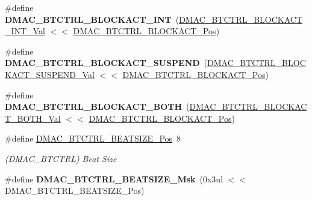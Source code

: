 \begin{DoxyCompactItemize}
\item 
\hypertarget{group___s_a_m_l21___d_m_a_c_gaaba7920eeccf5ffffb8eb5c977fcde63}{}\#define {\bfseries D\+M\+A\+C\+\_\+\+B\+T\+C\+T\+R\+L\+\_\+\+B\+L\+O\+C\+K\+A\+C\+T\+\_\+\+I\+N\+T}~(\hyperlink{group___s_a_m_l21___d_m_a_c_ga8605dcd06a16a3950e7181cd5a231bfc}{D\+M\+A\+C\+\_\+\+B\+T\+C\+T\+R\+L\+\_\+\+B\+L\+O\+C\+K\+A\+C\+T\+\_\+\+I\+N\+T\+\_\+\+Val}  $<$$<$ \hyperlink{group___s_a_m_l21___d_m_a_c_ga65ebce978928207ff9f7ae48e8a1c602}{D\+M\+A\+C\+\_\+\+B\+T\+C\+T\+R\+L\+\_\+\+B\+L\+O\+C\+K\+A\+C\+T\+\_\+\+Pos})\label{group___s_a_m_l21___d_m_a_c_gaaba7920eeccf5ffffb8eb5c977fcde63}

\item 
\hypertarget{group___s_a_m_l21___d_m_a_c_ga74b668d6b216e19fa82f4993f7ab4b3a}{}\#define {\bfseries D\+M\+A\+C\+\_\+\+B\+T\+C\+T\+R\+L\+\_\+\+B\+L\+O\+C\+K\+A\+C\+T\+\_\+\+S\+U\+S\+P\+E\+N\+D}~(\hyperlink{group___s_a_m_l21___d_m_a_c_ga6a02db6a41d6c6df8b95fae49b817100}{D\+M\+A\+C\+\_\+\+B\+T\+C\+T\+R\+L\+\_\+\+B\+L\+O\+C\+K\+A\+C\+T\+\_\+\+S\+U\+S\+P\+E\+N\+D\+\_\+\+Val} $<$$<$ \hyperlink{group___s_a_m_l21___d_m_a_c_ga65ebce978928207ff9f7ae48e8a1c602}{D\+M\+A\+C\+\_\+\+B\+T\+C\+T\+R\+L\+\_\+\+B\+L\+O\+C\+K\+A\+C\+T\+\_\+\+Pos})\label{group___s_a_m_l21___d_m_a_c_ga74b668d6b216e19fa82f4993f7ab4b3a}

\item 
\hypertarget{group___s_a_m_l21___d_m_a_c_ga89f76bbd6bc0047c6581e438d93aa1fe}{}\#define {\bfseries D\+M\+A\+C\+\_\+\+B\+T\+C\+T\+R\+L\+\_\+\+B\+L\+O\+C\+K\+A\+C\+T\+\_\+\+B\+O\+T\+H}~(\hyperlink{group___s_a_m_l21___d_m_a_c_gaff1916c577aec155dc2978b341daace2}{D\+M\+A\+C\+\_\+\+B\+T\+C\+T\+R\+L\+\_\+\+B\+L\+O\+C\+K\+A\+C\+T\+\_\+\+B\+O\+T\+H\+\_\+\+Val} $<$$<$ \hyperlink{group___s_a_m_l21___d_m_a_c_ga65ebce978928207ff9f7ae48e8a1c602}{D\+M\+A\+C\+\_\+\+B\+T\+C\+T\+R\+L\+\_\+\+B\+L\+O\+C\+K\+A\+C\+T\+\_\+\+Pos})\label{group___s_a_m_l21___d_m_a_c_ga89f76bbd6bc0047c6581e438d93aa1fe}

\item 
\hypertarget{group___s_a_m_l21___d_m_a_c_ga4961493aedfe85b741e91f8370b9586c}{}\#define \hyperlink{group___s_a_m_l21___d_m_a_c_ga4961493aedfe85b741e91f8370b9586c}{D\+M\+A\+C\+\_\+\+B\+T\+C\+T\+R\+L\+\_\+\+B\+E\+A\+T\+S\+I\+Z\+E\+\_\+\+Pos}~8\label{group___s_a_m_l21___d_m_a_c_ga4961493aedfe85b741e91f8370b9586c}

\begin{DoxyCompactList}\small\item\em (D\+M\+A\+C\+\_\+\+B\+T\+C\+T\+R\+L) Beat Size \end{DoxyCompactList}\item 
\hypertarget{group___s_a_m_l21___d_m_a_c_gaf5c9d9b90c75d827a93c7d6c6703dd44}{}\#define {\bfseries D\+M\+A\+C\+\_\+\+B\+T\+C\+T\+R\+L\+\_\+\+B\+E\+A\+T\+S\+I\+Z\+E\+\_\+\+Msk}~(0x3ul $<$$<$ D\+M\+A\+C\+\_\+\+B\+T\+C\+T\+R\+L\+\_\+\+B\+E\+A\+T\+S\+I\+Z\+E\+\_\+\+Pos)\label{group___s_a_m_l21___d_m_a_c_gaf5c9d9b90c75d827a93c7d6c6703dd44}


\end{DoxyCompactItemize}
